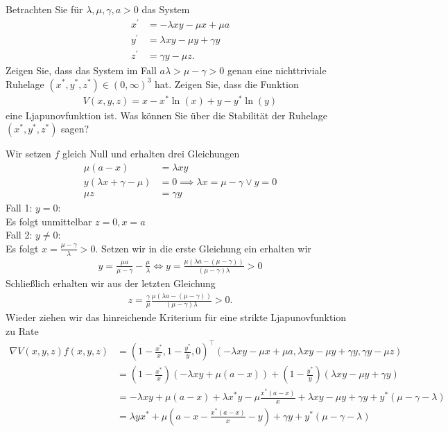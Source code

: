\begin{exercise}
Betrachten Sie für $\lambda, \mu, \gamma, a > 0$ das System
\begin{align*}
  x^{\prime} &= - \lambda xy - \mu x + \mu a \\
  y^{\prime} &= \lambda xy - \mu y + \gamma y \\
  z^{\prime} &= \gamma y - \mu z.
\end{align*}
Zeigen Sie, dass das System im Fall $a\lambda > \mu - \gamma > 0$ genau eine
nichttriviale Ruhelage $(x^*,y^*,z^*) \in (0,\infty)^3$ hat. Zeigen Sie, dass
die Funktion
\begin{align*}
  V(x,y,z) = x - x^*\ln(x) + y - y^*\ln(y)
\end{align*}
eine Ljapunovfunktion ist. Was können Sie über die Stabilität der Ruhelage $(x^*,y^*,z^*)$
sagen?
\end{exercise}

\begin{solution}
Wir setzen $f$ gleich Null und erhalten drei Gleichungen
\begin{align}
  \mu (a-x) &= \lambda xy \\
  y(\lambda x + \gamma - \mu) &= 0 \implies \lambda x  = \mu - \gamma \lor y = 0\\
  \mu z &= \gamma y \label{3}
\end{align}
Fall 1: $y = 0$: \\
Es folgt unmittelbar $z = 0, x = a$ \\
Fall 2: $y \neq 0$: \\
Es folgt $x = \frac{\mu - \gamma}{\lambda} > 0$. Setzen wir in die erste Gleichung ein
erhalten wir
\begin{align*}
  y = \frac{\mu a}{\mu - \gamma} - \frac{\mu}{\lambda}
  \iff y = \frac{\mu(\lambda a - (\mu - \gamma))}{(\mu - \gamma)\lambda} > 0
\end{align*}
Schließlich erhalten wir aus der letzten Gleichung
\begin{align*}
  z = \frac{\gamma}{\mu} \frac{\mu(\lambda a - (\mu - \gamma))}{(\mu - \gamma)\lambda} > 0.
\end{align*}
Wieder ziehen wir das hinreichende Kriterium für eine strikte Ljapunovfunktion zu Rate
\begin{align*}
  \nabla V(x,y,z)f(x,y,z) &= (1 - \frac{x^*}{x}, 1 - \frac{y^*}{y}, 0)^{\top}
  (- \lambda xy - \mu x + \mu a,\lambda xy - \mu y + \gamma y, \gamma y - \mu z) \\
  &= (1 - \frac{x^*}{x})(- \lambda xy + \mu (a - x)) + (1 - \frac{y^*}{y})(\lambda xy - \mu y + \gamma y) \\
  &= - \lambda xy + \mu (a - x) + \lambda x^*y - \mu \frac{x^*(a-x)}{x} + \lambda xy - \mu y + \gamma y
  + y^*(\mu - \gamma - \lambda)  \\
  &= \lambda y x^* + \mu (a - x - \frac{x^*(a-x)}{x} - y) + \gamma y + y^*(\mu - \gamma - \lambda)
\end{align*}
\end{solution}
